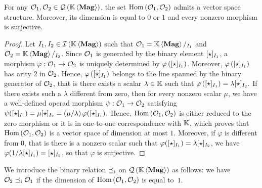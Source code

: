 \begin{Proposition} \label{prop:endomorphisms_of_magmatic_operads}
    For any $\mathcal{O}_1, \mathcal{O}_2 \in \mathcal{Q}\left(\mathbb{K} \left\langle\mathbf{Mag}\right\rangle\right)$, the set
    $\mathrm{Hom}\left(\mathcal{O}_1,\mathcal{O}_2\right)$ admits a vector space structure.
    Moreover, its dimension is equal to $0$ or $1$ and every nonzero
    morphism is surjective.
\end{Proposition}
\begin{proof}
    Let $I_1, I_2 \in \mathcal{I}\left(\mathbb{K} \left\langle\mathbf{Mag}\right\rangle\right)$ such that $\mathcal{O}_1 = \mathbb{K} \left\langle\mathbf{Mag}\right\rangle/_{I_1}$ and
    $\mathcal{O}_2 = \mathbb{K} \left\langle\mathbf{Mag}\right\rangle/_{I_2}$. Since $\mathcal{O}_1$ is generated by the binary
    element $[\operatorname{\star}]_{I_1}$, a morphism $\varphi:\mathcal{O}_1\to\mathcal{O}_2$ is
    uniquely determined by $\varphi\left([\operatorname{\star}]_{I_1}\right)$.
    Moreover, $\varphi\left([\operatorname{\star}]_{I_1}\right)$ has arity $2$ in
    $\mathcal{O}_2$. Hence, $\varphi\left([\operatorname{\star}]_{I_1}\right)$ belongs to
    the line spanned by the binary generator of $\mathcal{O}_2$, that is there
    exists a scalar $\lambda\in\mathbb{K}$ such that
    \begin{math}
        \varphi\left([\operatorname{\star}]_{I_1}\right)
        = \lambda[\operatorname{\star}]_{I_2}.
    \end{math}
    If there exists such a $\lambda$ different from zero, then for every
    nonzero scalar $\mu$, we have a well-defined operad morphism
    $\psi:\mathcal{O}_1\to\mathcal{O}_2$ satisfying
    \begin{math}
        \psi([\operatorname{\star}]_{I_1}) =\mu[\operatorname{\star}]_{I_2}
        = \left(\mu/\lambda\right)\varphi([\operatorname{\star}]_{I_1}).
    \end{math}
    Hence, $\mathrm{Hom}\left(\mathcal{O}_1,\mathcal{O}_2\right)$ is either reduced to the
    zero morphism or it is in one-to-one correspondence with $\mathbb{K}$, which
    proves that $\mathrm{Hom}\left(\mathcal{O}_1,\mathcal{O}_2\right)$ is a vector space of
    dimension at most $1$. Moreover, if $\varphi$ is different from $0$,
    that is there is a nonzero scalar such that
    $\varphi([\operatorname{\star}]_{I_1}) =\lambda[\operatorname{\star}]_{I_2}$, we have
    $\varphi(1/\lambda[\operatorname{\star}]_{I_1}) =[\operatorname{\star}]_{I_2}$, so that
    $\varphi$ is surjective.
\end{proof}
\medbreak

We introduce the binary relation $\preceq_{\mathrm{i}}$ on $\mathcal{Q}\left(\mathbb{K} \left\langle\mathbf{Mag}\right\rangle\right)$ as follows: we
have $\mathcal{O}_2\preceq_{\mathrm{i}}\mathcal{O}_1$ if the dimension of
$\mathrm{Hom}\left(\mathcal{O}_1,\mathcal{O}_2\right)$ is equal to~$1$.
\medbreak

